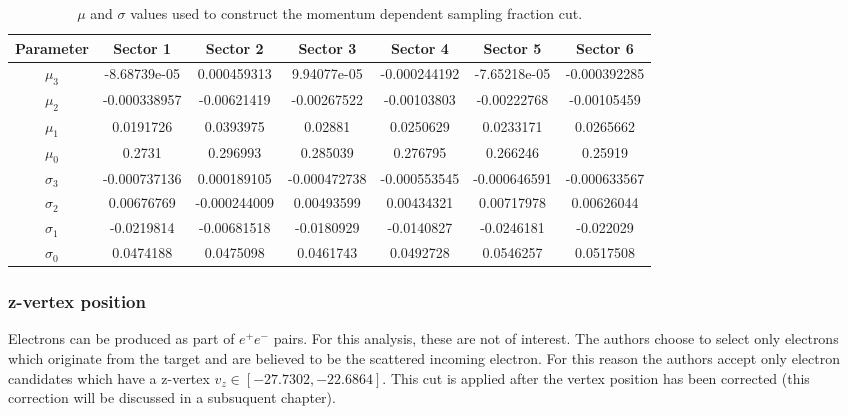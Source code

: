 \begin{table}[h]
  \centering 

  \begin{tabular}{c | c | c | c | c | c | c}
    Parameter & Sector 1 & Sector 2 & Sector 3 & Sector 4 & Sector 5 & Sector 6                           \\
    \hline
    $\mu_3$     & -8.68739e-05 & 0.000459313  &  9.94077e-05 & -0.000244192 & -7.65218e-05 & -0.000392285  \\
    $\mu_2$     & -0.000338957 & -0.00621419  & -0.00267522  & -0.00103803  & -0.00222768  & -0.00105459   \\
    $\mu_1$     &  0.0191726   &  0.0393975   &  0.02881     &  0.0250629   &  0.0233171   &  0.0265662    \\
    $\mu_0$     &  0.2731      &  0.296993    &  0.285039    &  0.276795    &  0.266246    &  0.25919      \\
    $\sigma_3$  & -0.000737136 &  0.000189105 & -0.000472738 & -0.000553545 & -0.000646591 & -0.000633567  \\
    $\sigma_2$  &  0.00676769  & -0.000244009 &  0.00493599  &  0.00434321  &  0.00717978  &  0.00626044   \\
    $\sigma_1$  & -0.0219814   & -0.00681518  & -0.0180929   & -0.0140827   & -0.0246181   & -0.022029     \\
    $\sigma_0$  &  0.0474188   &  0.0475098   &  0.0461743   &  0.0492728   &  0.0546257   &  0.0517508    
  \end{tabular}
  \caption{$\mu$ and $\sigma$ values used to construct the momentum dependent sampling fraction cut.}
  \label{table-sampling-fraction}
\end{table}

\subsubsection*{z-vertex position}
Electrons can be produced as part of $e^+ e^-$ pairs.  For this analysis, these are not of interest.  The authors choose to select only electrons which originate from the target and are believed to be the scattered incoming electron.  For this reason the authors accept only electron candidates which have a z-vertex $v_z \in [-27.7302, -22.6864]$.  This cut is applied after the vertex position has been corrected (this correction will be discussed in a subsuquent chapter).


